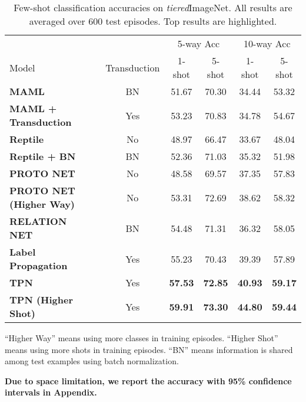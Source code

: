 \documentclass{article} \usepackage{iclr2019_conference,times}
\def\tiered{{\textit{tiered}ImageNet}}
\begin{document}
\begin{table}[t]
\centering
\begin{threeparttable}
\small
\caption{Few-shot classification accuracies on \tiered. All results are averaged over 600 test episodes. Top results are highlighted.}
\label{tiered-results}
\begin{tabular}{lccccc}
\hline
                                       						&              & \multicolumn{2}{c}{5-way Acc} & \multicolumn{2}{c}{10-way Acc}                           \\
Model                                  						& Transduction & \multicolumn{1}{c}{1-shot} & \multicolumn{1}{c}{5-shot} & \multicolumn{1}{c}{1-shot} & \multicolumn{1}{c}{5-shot} \\ \hline
\textbf{MAML~\citep{maml}}                          		& BN & 51.67  & 70.30 & 34.44 & 53.32  \\
\textbf{MAML + Transduction}                                & Yes & 53.23  & 70.83 & 34.78 & 54.67  \\
\textbf{Reptile~\citep{first-order}}                        & No & 48.97  & 66.47 & 33.67 & 48.04  \\
\textbf{Reptile + BN~\citep{first-order}}                   & BN & 52.36  & 71.03 & 35.32 & 51.98  \\
\textbf{PROTO NET~\citep{prototypical}}                     & No & 48.58  & 69.57 & 37.35 & 57.83  \\
\textbf{PROTO NET (Higher Way)~\citep{prototypical}}        & No & 53.31  & 72.69 & 38.62 & 58.32  \\
\textbf{RELATION NET~\citep{compare}}                  		& BN & 54.48  & 71.31 & 36.32 & 58.05  \\ \hline
\textbf{Label Propagation}                                  & Yes & 55.23  & 70.43 & 39.39 & 57.89  \\
\textbf{TPN}     				                            & Yes & \textbf{57.53}  & \textbf{72.85} & \textbf{40.93} & \textbf{59.17}   \\
\textbf{TPN (Higher Shot)}   	                            & Yes & \textbf{59.91}  & \textbf{73.30} & \textbf{44.80} & \textbf{59.44}   \\ \hline
\end{tabular}
\begin{tablenotes}
  	\item * ``Higher Way'' means using more classes in training episodes. ``Higher Shot'' means using more shots in training episodes. ``BN'' means information is shared among test examples using batch normalization.
  	\item  \textbf{Due to space limitation, we report the accuracy with 95\% confidence intervals in Appendix.}
\end{tablenotes} 
\end{threeparttable}
\end{table}
\end{document}

